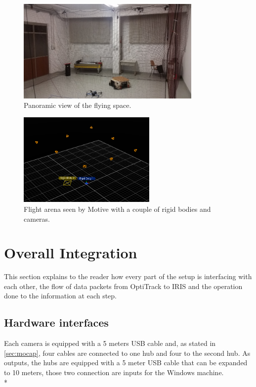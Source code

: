\begin{figure}[h]
\centering
 \includegraphics[width=0.8\textwidth]{panoramic.png}
 \caption[Flight arena panoramic]{Panoramic view of the flying space.}
 \label{figure:arenapano}
\end{figure}

\begin{figure}[h]
	\centering
	\includegraphics[width=0.6\textwidth]{motiv_panorama.PNG}
	\caption[Flight arena from motive]{Flight arena seen by Motive with a couple of rigid bodies and cameras.}
	\label{figure:arenamotive}
\end{figure}



\section{Overall Integration}
\label{sec:integration}

This section explains to the reader how every part of the setup is interfacing with each other, the flow of data packets from OptiTrack to IRIS and the operation done to the information at each step.

\subsection{Hardware interfaces}

Each camera is equipped with a 5 meters USB cable and, as stated in \ref{sec:mocap}, four cables are connected to one hub and four to the second hub. As outputs, the hubs are equipped with a 5 meter USB cable that can be expanded to 10 meters, those two connection are inputs for the Windows machine. \\*

